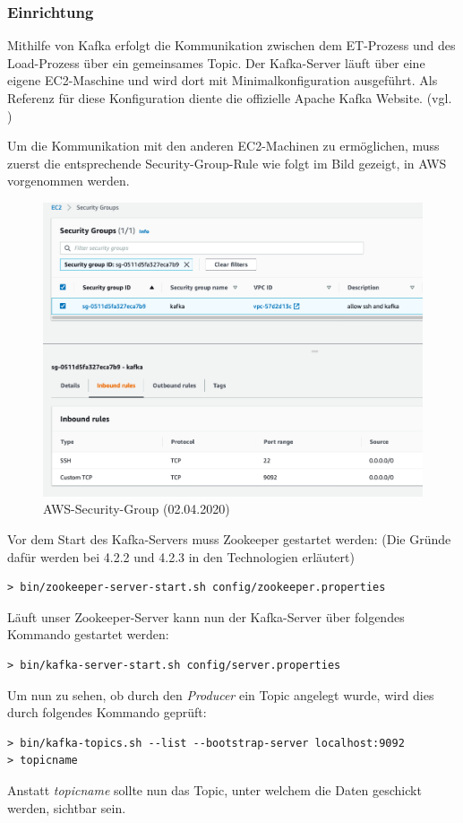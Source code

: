 \subsubsection{Einrichtung}
Mithilfe von Kafka erfolgt die Kommunikation zwischen dem ET-Prozess und des Load-Prozess über ein gemeinsames Topic. Der Kafka-Server läuft über eine eigene EC2-Maschine und wird dort mit Minimalkonfiguration ausgeführt. Als Referenz für diese Konfiguration diente die offizielle Apache Kafka Website. (vgl. \cite{Kafka-Quickstart})
\vspace{4mm}\par
Um die Kommunikation mit den anderen EC2-Machinen zu ermöglichen, muss zuerst die entsprechende Security-Group-Rule wie folgt im Bild gezeigt, in AWS vorgenommen werden.
\begin{figure}[H]
    \centering
    \includegraphics[scale=0.35]{images/aws-kafka-security.png}
    \caption{AWS-Security-Group (02.04.2020)}
\end{figure}
\newpage
Vor dem Start des Kafka-Servers muss Zookeeper gestartet werden: 
(Die Gründe dafür werden bei 4.2.2 und 4.2.3 in den Technologien erläutert)
\begin{lstlisting}[caption={Zookeeper-Start}]
> bin/zookeeper-server-start.sh config/zookeeper.properties
\end{lstlisting}
\vspace{4mm}\par
Läuft unser Zookeeper-Server kann nun der Kafka-Server über folgendes Kommando gestartet werden: 
\begin{lstlisting}[caption={Kafka-Start}]
> bin/kafka-server-start.sh config/server.properties
\end{lstlisting}
\vspace{4mm}\par
Um nun zu sehen, ob durch den \textit{Producer} ein Topic angelegt wurde, wird dies durch folgendes Kommando geprüft:
\begin{lstlisting}[caption={Topic-Check}]
> bin/kafka-topics.sh --list --bootstrap-server localhost:9092
> topicname
\end{lstlisting}
Anstatt \textit{topicname} sollte nun das Topic, unter welchem die Daten geschickt werden, sichtbar sein.
